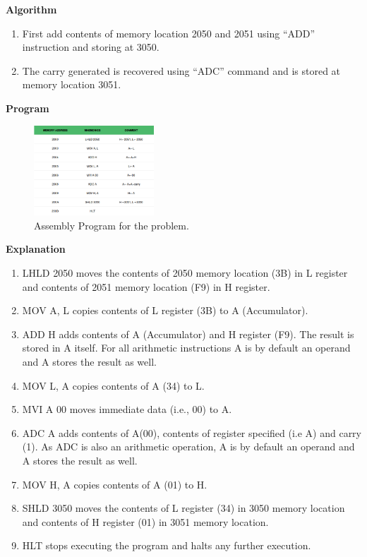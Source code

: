 \documentclass[12pt]{article}
\begin{document}
\textbf{Algorithm}\\
\begin{enumerate}
\item First add contents of memory location 2050 and 2051 using “ADD” instruction and storing at 3050.
\item The carry generated is recovered using “ADC” command and is stored at memory location 3051.
\end{enumerate}
\textbf{Program}\\
        \begin{figure}[H]
\centering
\includegraphics[width=0.4\textwidth]{prog_g.png}
\caption{\label{fig:prob_sol}Assembly Program for the problem.}
\end{figure}
\textbf{Explanation}\\
\begin{enumerate}
\item LHLD 2050 moves the contents of 2050 memory location (3B) in L register and contents of 2051 memory location (F9) in H register.
\item MOV A, L copies contents of L register (3B) to A (Accumulator).
\item ADD H adds contents of A (Accumulator) and H register (F9). The result is stored in A itself. For all arithmetic instructions A is by default an operand and A stores the result as well.
\item MOV L, A copies contents of A (34) to L.
\item MVI A 00 moves immediate data (i.e., 00) to A.
\item ADC A adds contents of A(00), contents of register specified (i.e A) and carry (1). As ADC is also an arithmetic operation, A is by default an operand and A stores the result as well.
\item MOV H, A copies contents of A (01) to H.
\item SHLD 3050 moves the contents of L register (34) in 3050 memory location and contents of H register (01) in 3051 memory location.
\item HLT stops executing the program and halts any further execution.\\\\
\end{enumerate}
\end{document}
